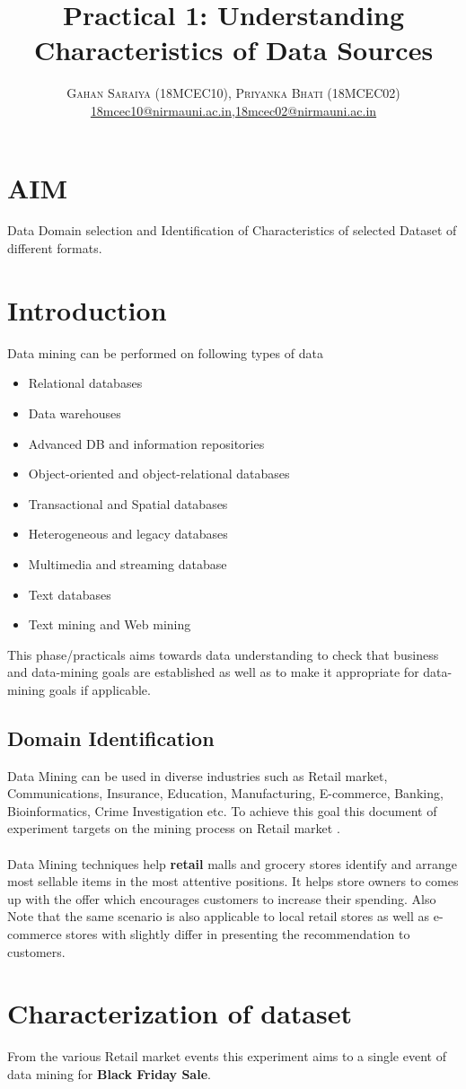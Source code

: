 \documentclass[paper=letter, fontsize=12pt]{article}
\title{\vspace{-15mm}\fontsize{24pt}{10pt}\selectfont\textbf{Practical 1: Understanding Characteristics of Data Sources}} %
\author{
\large
{\textsc{Gahan Saraiya (18MCEC10), Priyanka Bhati (18MCEC02) }}\\[2mm]
\normalsize \href{mailto:18mcec10@nirmauni.ac.in}{18mcec10@nirmauni.ac.in},\href{mailto:18mcec02@nirmauni.ac.in}{18mcec02@nirmauni.ac.in}\\[2mm] %
}
\date{}
\begin{document}
\maketitle %
\thispagestyle{fancy} %

\section{AIM}
Data Domain selection and Identification of Characteristics of selected Dataset of different formats.

\section{Introduction}
Data mining can be performed on following types of data 
\begin{itemize}
    \item Relational databases
    \item Data warehouses
    \item Advanced DB and information repositories
    \item Object-oriented and object-relational databases
    \item Transactional and Spatial databases
    \item Heterogeneous and legacy databases
    \item Multimedia and streaming database
    \item Text databases
    \item Text mining and Web mining 
\end{itemize}
This phase/practicals aims towards data understanding to check that business and data-mining goals are established as well as to make it appropriate for data-mining goals if applicable.

\subsection{Domain Identification}
Data Mining can be used in diverse industries such as Retail market, Communications, Insurance, Education, Manufacturing, E-commerce, Banking, Bioinformatics, Crime Investigation etc.
To achieve this goal this document of experiment targets on the mining process on Retail market .
\paragraph{} Data Mining techniques help \textbf{retail} malls and grocery stores identify and arrange most sellable items in the most attentive positions. It helps store owners to comes up with the offer which encourages customers to increase their spending. 
Also Note that the same scenario is also applicable to local retail stores as well as e-commerce stores with slightly differ in presenting the recommendation to customers.


\section{Characterization of dataset}
From the various Retail market events this experiment aims to a single event of data mining for \textbf{Black Friday Sale}.

\end{document}
